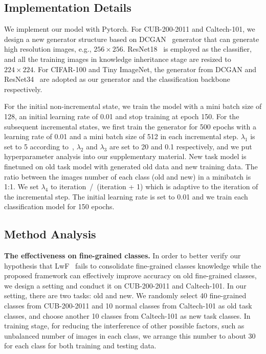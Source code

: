 \documentclass[10pt,twocolumn,letterpaper]{article}
\begin{document}
\subsection{Implementation Details}
We implement our model with Pytorch. 
For CUB-200-2011 and Caltech-101, we design a new generator structure based on DCGAN~\cite{dcgan} generator that can generate high resolution images, e.g., $256\times256$. ResNet18~\cite{he2016deep} is employed as the classifier, and all the training images in knowledge inheritance stage are resized to $224\times224$. 
For CIFAR-100 and Tiny ImageNet, the generator from DCGAN and ResNet34~\cite{he2016deep} are adopted as our generator and the classification backbone respectively. 

For the initial non-incremental state, we train the model with a mini batch size of 128, an initial learning rate of 0.01 and stop training at epoch 150.
For the subsequent incremental states, we first train the generator for 500 epochs with a learning rate of 0.01 and a mini batch size of 512 in each incremental step.
$\lambda_1$ is set to 5 according to~\cite{chen2019data}, $\lambda_2$ and $\lambda_3$ are set to 20 and 0.1 respectively, and we put hyperparameter analysis into our supplementary material.
New task model is finetuned on old task model with generated old data and new training data. The ratio between the images number of each class (old and new) in a minibatch is 1:1. We set $\lambda_4$ to iteration~/~(iteration + 1) which is adaptive to the iteration of the incremental step. The initial learning rate is set to 0.01 and we train each classification model for 150 epochs.
\vspace{-2mm}
\subsection{Method Analysis}

\textbf{The effectiveness on fine-grained classes.}
In order to better verify our hypothesis that LwF~\cite{li2017learning} fails to consolidate fine-grained classes knowledge while the proposed framework can effectively improve accuracy on old fine-grained classes, we design a setting and conduct it on CUB-200-2011 and Caltech-101. 
In our setting, there are two tasks: old and new. We randomly select 40 fine-grained classes from CUB-200-2011 and 10 normal classes from Caltech-101 as old task classes, and choose another 10 classes from Caltech-101 as new task classes. 
In training stage, for reducing the interference of other possible factors, such as unbalanced number of images in each class, we arrange this number to about 30 for each class for both training and testing data.
\end{document}
